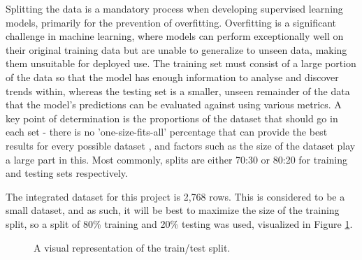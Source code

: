 \documentclass[12pt]{report}
\newcommand{\para}{\vspace{8pt}\noindent}
\begin{document}

\para Splitting the data is a mandatory process when developing supervised learning models, primarily for the prevention of overfitting.
Overfitting is a significant challenge in machine learning, where models can perform exceptionally well on their original training data but 
are unable to generalize to unseen data, making them unsuitable for deployed use. The training set must consist of a large portion of the 
data so that the model has enough information to analyse and discover trends within, whereas the testing set is a smaller, unseen remainder 
of the data that the model's predictions can be evaluated against using various metrics. A key point of determination is the proportions 
of the dataset that should go in each set - there is no 'one-size-fits-all' percentage that can provide the best results for every possible dataset \autocite{sivakumar_trade-off_2024},
and factors such as the size of the dataset play a large part in this. Most commonly, splits are either 70:30 or 80:20 for training and testing sets 
respectively.

\para The integrated dataset for this project is 2,768 rows. This is considered to be a small dataset, and as such, it will be best to 
maximize the size of the training split, so a split of 80\% training and 20\% testing was used, visualized in Figure \ref{fig:TrainTestDiagram}.

\begin{figure}[H]
    \centering
    \caption{A visual representation of the train/test split.}
    \label{fig:TrainTestDiagram}
\end{figure}
\end{document}
